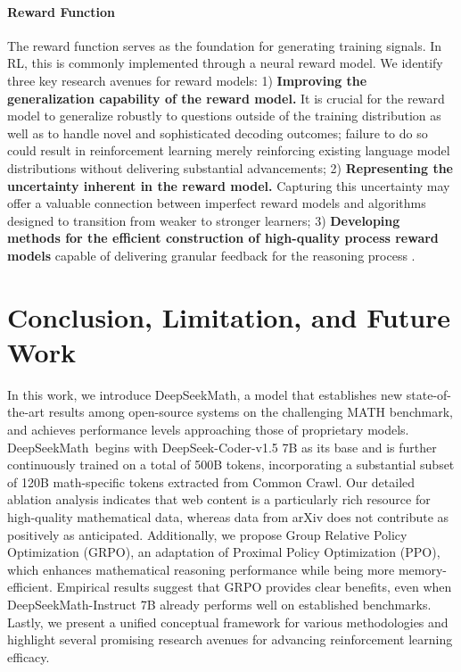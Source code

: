\begin{itemize}[topsep=0pt]
\paragraph{Reward Function} The reward function serves as the foundation for generating training signals. In RL, this is commonly implemented through a neural reward model. We identify three key research avenues for reward models: 1) \textbf{Improving the generalization capability of the reward model.} It is crucial for the reward model to generalize robustly to questions outside of the training distribution as well as to handle novel and sophisticated decoding outcomes; failure to do so could result in reinforcement learning merely reinforcing existing language model distributions without delivering substantial advancements; 2) \textbf{Representing the uncertainty inherent in the reward model.} Capturing this uncertainty may offer a valuable connection between imperfect reward models and algorithms designed to transition from weaker to stronger learners; 3) \textbf{Developing methods for the efficient construction of high-quality process reward models} capable of delivering granular feedback for the reasoning process \citep{lightman2023let,wang2023math}.

\section{Conclusion, Limitation, and Future Work}  
In this work, we introduce DeepSeekMath, a model that establishes new state-of-the-art results among open-source systems on the challenging MATH benchmark, and achieves performance levels approaching those of proprietary models. DeepSeekMath~begins with DeepSeek-Coder-v1.5 7B as its base and is further continuously trained on a total of 500B tokens, incorporating a substantial subset of 120B math-specific tokens extracted from Common Crawl. Our detailed ablation analysis indicates that web content is a particularly rich resource for high-quality mathematical data, whereas data from arXiv does not contribute as positively as anticipated. Additionally, we propose Group Relative Policy Optimization (GRPO), an adaptation of Proximal Policy Optimization (PPO), which enhances mathematical reasoning performance while being more memory-efficient. Empirical results suggest that GRPO provides clear benefits, even when DeepSeekMath-Instruct 7B already performs well on established benchmarks. Lastly, we present a unified conceptual framework for various methodologies and highlight several promising research avenues for advancing reinforcement learning efficacy.


\end{itemize}
